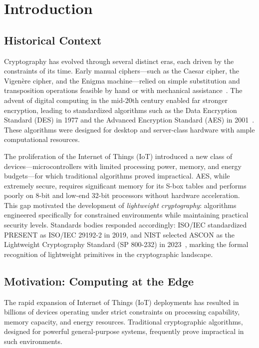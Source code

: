 \documentclass[12pt]{report}
\begin{document}
\newpage
{}
{}
\chapter{Introduction}

\section{Historical Context}

Cryptography has evolved through several distinct eras, each driven by the
constraints of its time. Early manual ciphers---such as the Caesar cipher,
the Vigen\`ere cipher, and the Enigma machine---relied on simple
substitution and transposition operations feasible by hand or with
mechanical assistance~\cite{singh2000codebook}. The advent of digital
computing in the mid-20th century enabled far stronger encryption, leading
to standardized algorithms such as the Data Encryption Standard (DES) in
1977 and the Advanced Encryption Standard (AES) in 2001~\cite{nist2001aes}.
These algorithms were designed for desktop and server-class hardware with
ample computational resources.

The proliferation of the Internet of Things (IoT) introduced a new class
of devices---microcontrollers with limited processing power, memory, and
energy budgets---for which traditional algorithms proved impractical.
AES, while extremely secure, requires significant memory for its
S-box tables and performs poorly on 8-bit and low-end 32-bit processors
without hardware acceleration. This gap motivated the development of
\textit{lightweight cryptography}: algorithms engineered specifically for
constrained environments while maintaining practical security levels.
Standards bodies responded accordingly: ISO/IEC standardized PRESENT
as ISO/IEC 29192-2 in 2019, and NIST selected ASCON as the Lightweight
Cryptography Standard (SP 800-232) in 2023~\cite{iso29192,nist2025ascon},
marking the formal recognition of lightweight primitives in the
cryptographic landscape.

\section{Motivation: Computing at the Edge}

The rapid expansion of Internet of Things (IoT) deployments has resulted in billions of
devices operating under strict constraints on processing capability, memory capacity,
and energy resources. Traditional cryptographic algorithms, designed for powerful general-purpose
systems, frequently prove impractical in such environments.
\end{document}
